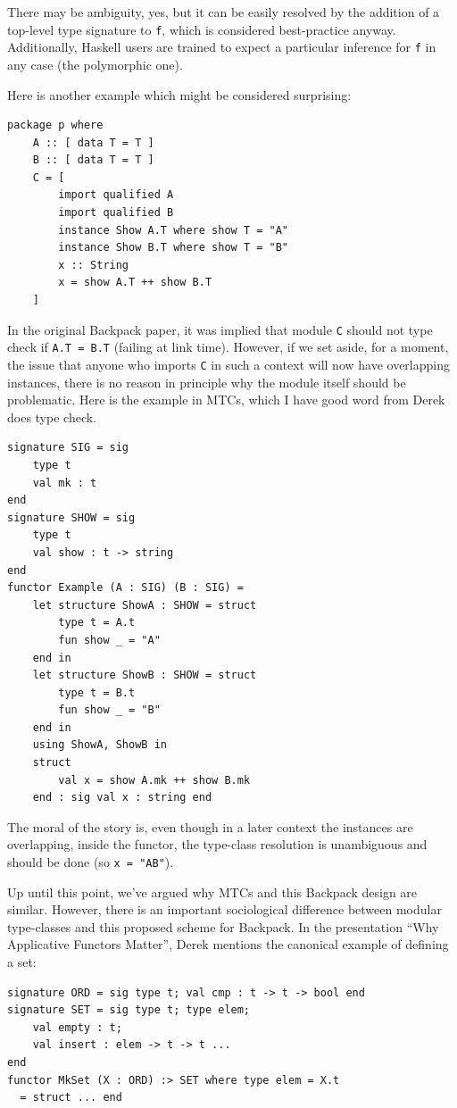 \documentclass{article}
\begin{document}
There may be ambiguity, yes, but it can be easily resolved by the
addition of a top-level type signature to \verb|f|, which is considered
best-practice anyway.  Additionally, Haskell users are trained to expect
a particular inference for \verb|f| in any case (the polymorphic one).

Here is another example which might be considered surprising:

\begin{verbatim}
package p where
    A :: [ data T = T ]
    B :: [ data T = T ]
    C = [
        import qualified A
        import qualified B
        instance Show A.T where show T = "A"
        instance Show B.T where show T = "B"
        x :: String
        x = show A.T ++ show B.T
    ]
\end{verbatim}

In the original Backpack paper, it was implied that module \verb|C|
should not type check if \verb|A.T = B.T| (failing at link time).
However, if we set aside, for a moment, the issue that anyone who
imports \verb|C| in such a context will now have overlapping instances,
there is no reason in principle why the module itself should be
problematic.  Here is the example in MTCs, which I have good word from
Derek does type check.

\begin{verbatim}
signature SIG = sig
    type t
    val mk : t
end
signature SHOW = sig
    type t
    val show : t -> string
end
functor Example (A : SIG) (B : SIG) =
    let structure ShowA : SHOW = struct
        type t = A.t
        fun show _ = "A"
    end in
    let structure ShowB : SHOW = struct
        type t = B.t
        fun show _ = "B"
    end in
    using ShowA, ShowB in
    struct
        val x = show A.mk ++ show B.mk
    end : sig val x : string end
\end{verbatim}

The moral of the story is, even though in a later context the instances
are overlapping, inside the functor, the type-class resolution is unambiguous
and should be done (so \verb|x = "AB"|).

Up until this point, we've argued why MTCs and this Backpack design are similar.
However, there is an important sociological difference between modular type-classes
and this proposed scheme for Backpack.  In the presentation ``Why Applicative
Functors Matter'', Derek mentions the canonical example of defining a set:

\begin{verbatim}
signature ORD = sig type t; val cmp : t -> t -> bool end
signature SET = sig type t; type elem;
    val empty : t;
    val insert : elem -> t -> t ...
end
functor MkSet (X : ORD) :> SET where type elem = X.t
  = struct ... end
\end{verbatim}
\end{document}

